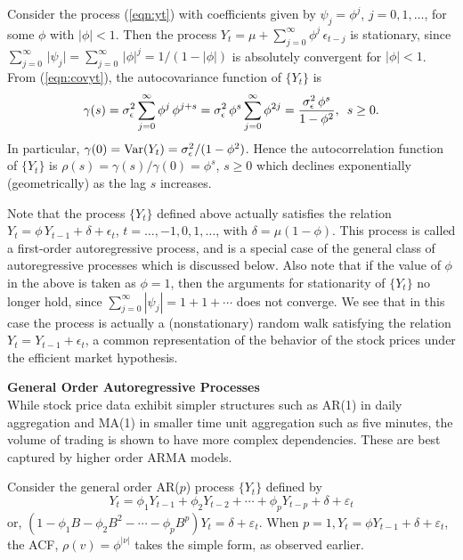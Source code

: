 \begin{ex}\label{ex:autoregor1}
Consider the process (\ref{eqn:yt}) with coefficients given by $\psi_j = \phi^j$, $j=0,1,\ldots$,  for some $\phi$ with $\lvert\phi\rvert<1$. Then the process $Y_t = \mu + \sum_{j=0}^{\infty} \phi^j \, \epsilon_{t-j}$ is stationary, since $\sum_{j=0}^{\infty} \, \lvert\psi_j\rvert= \sum_{j=0}^{\infty} \, \lvert\phi\rvert^j = 1/(1-\lvert\phi\rvert)$ is absolutely convergent for $\lvert\phi\rvert < 1$. From (\ref{eqn:covyt}), the autocovariance function of $\{Y_t\}$ is
	\[
	\gamma(s)= \sigma^2_{\epsilon} \sum_{j=0}^{\infty} \phi^j \, \phi^{j+s}= \sigma^2_{\epsilon} \, \phi^s \sum_{j=0}^{\infty} \phi^{2j}= \frac{\sigma^2_{\epsilon} \, \phi^s}{1 - \phi^2}, \enskip s \geq 0.
	\]
In particular, $\gamma(0) = \operatorname{Var}(Y_t) = \sigma^2_{\epsilon}/(1-\phi^2)$. Hence the autocorrelation function of $\{Y_t\}$ is $\rho(s)= \gamma(s)/\gamma(0)= \phi^s$, $ s \geq 0$ which declines exponentially (geometrically) as the lag $s$ increases.


Note that the process $\{Y_t\}$ defined above actually satisfies the relation $Y_t= \phi \, Y_{t-1} + \delta+\epsilon_t$, $t=\ldots,-1,0,1,\ldots$, with $\delta = \mu(1-\phi)$. This process is called a first-order autoregressive process, and is a special case of the general class of autoregressive processes which is discussed below. Also note that if the value of $\phi$ in the above is taken as  $\phi = 1$, then the arguments for stationarity of $\{Y_t\}$ no longer hold, since $\sum_{j=0}^{\infty} |\psi_j| = 1+1+\cdots$ does not converge. We see that in this case the process is actually a (nonstationary) random walk satisfying the relation  $Y_t = Y_{t-1}+\epsilon_t$, a common representation of the behavior of the stock prices under the efficient market hypothesis. 
\end{ex}


\noindent\textbf{General Order Autoregressive Processes} \\

While stock price data exhibit simpler structures such as AR(1) in daily aggregation and MA(1) in smaller time unit aggregation such as five minutes, the volume of trading is shown to have more complex dependencies. These are best captured by higher order ARMA models. 

Consider the general order AR($p$) process $\{Y_t\}$ defined by
	\begin{equation}\label{eqn:ytsum}
	Y_t = \phi_1Y_{t-1} + \phi_2Y_{t-2} +\cdots + \phi_pY_{t-p} + \delta + \varepsilon_t
	\end{equation}
or, $(1-\phi_1B - \phi_2B^2 - \cdots - \phi_pB^p)Y_t = \delta + \varepsilon_t$. When $p=1, Y_t = \phi Y_{t-1} + \delta + \varepsilon_t$, the ACF, $\rho(v)=\phi^{\lvert \nu \rvert}$ takes the simple form, as observed earlier.


